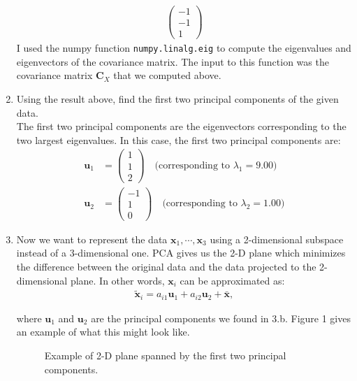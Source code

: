 \documentclass[a3paper,12pt]{extarticle} %
\begin{document}
\begin{enumerate}
\begin{align}
\begin{pmatrix}
    -1\\
    -1\\
    1
    \end{pmatrix}
\end{align}
I used the numpy function \texttt{numpy.linalg.eig} to compute the eigenvalues and eigenvectors of the covariance matrix. The input to this function was the covariance matrix $\mathbf{C}_X$ that we computed above.   
\item 
Using the result above, find the first two principal components of the given data.
\\ The first two principal components are the eigenvectors corresponding to the two largest eigenvalues. In this case, the first two principal components are:
\begin{align}
\mathbf{u}_1 &= \begin{pmatrix}
1\\
1\\
2
\end{pmatrix} \quad \text{(corresponding to } \lambda_1 = 9.00\text{)}\\
\mathbf{u}_2 &= \begin{pmatrix}
-1\\
1\\
0
\end{pmatrix} \quad \text{(corresponding to } \lambda_2 = 1.00\text{)}
\end{align}

\item
Now we want to represent the data $\mathbf{x}_1, \cdots, \mathbf{x}_3$ using a 2-dimensional subspace instead of a 3-dimensional one. PCA gives us the 2-D plane which minimizes the difference between the original data and the data projected to the 2-dimensional plane. In other words, $\mathbf{x}_i$ can be approximated as:
\begin{align}
\tilde{\mathbf{x}}_i = a_{i1}\mathbf{u}_1 + a_{i2}\mathbf{u}_2 + \bar{\mathbf{x}},
\end{align}

where $\mathbf{u}_1$ and $\mathbf{u}_2$ are the principal components we found in 3.b. Figure 1 gives an example of what this might look like.

\begin{figure}[h]
\centering
\caption{Example of 2-D plane spanned by the first two principal components.}
\end{figure}


\end{enumerate}
\end{document}
